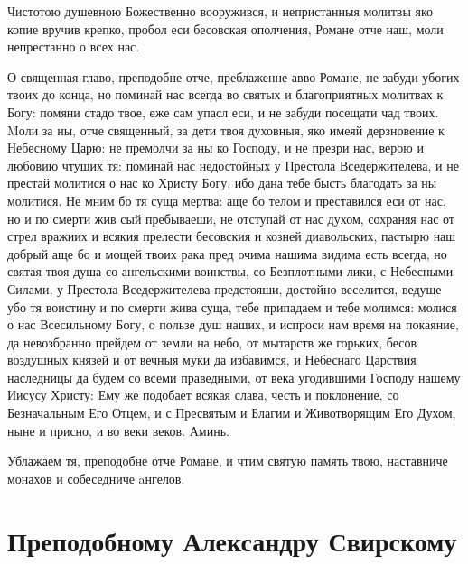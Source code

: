 Чистотою душевною Божественно вооружився, и непристанныя молитвы яко копие вручив крепко, пробол еси бесовская ополчения, Романе отче наш, моли непрестанно о всех нас.




О священная главо, преподобне отче, преблаженне авво Романе, не забуди убогих твоих до конца, но поминай нас всегда во святых и благоприятных молитвах к Богу: помяни стадо твое, еже сам упасл еси, и не забуди посещати чад твоих. Mоли за ны, отче священный, за дети твоя духовныя, яко имеяй дерзновение к Небесному Царю: не премолчи за ны ко Господу, и не презри нас, верою и любовию чтущих тя: поминай нас недостойных у Престола Вседержителева, и не престай молитися о нас ко Христу Богу, ибо дана тебе бысть благодать за ны молитися. Не мним бо тя суща мертва: аще бо телом и преставился еси от нас, но и по смерти жив сый пребываеши, не отступай от нас духом, сохраняя нас от стрел вражиих и всякия прелести бесовския и козней диавольских, пастырю наш добрый аще бо и мощей твоих рака пред очима нашима видима есть всегда, но святая твоя душа со ангельскими воинствы, со Безплотными лики, с Небесными Силами, у Престола Вседержителева предстояши, достойно веселится, ведуще убо тя воистину и по смерти жива суща, тебе припадаем и тебе молимся: молися о нас Всесильному Богу, о пользе душ наших, и испроси нам время на покаяние, да невозбранно прейдем от земли на небо, от мытарств же горьких, бесов воздушных князей и от вечныя муки да избавимся, и Небеснаго Царствия наследницы да будем со всеми праведными, от века угодившими Господу нашему Иисусу Христу: Ему же подобает всякая слава, честь и поклонение, со Безначальным Его Отцем, и с Пресвятым и Благим и Животворящим Его Духом, ныне и присно, и во веки веков. Аминь.




Ублажаем тя, преподобне отче Романе, и чтим святую память твою, наставниче монахов и собеседниче aнгелов.

\longpage[2]{}\mychapterending


 

\section{Преподобному Александру Свирскому}
 

